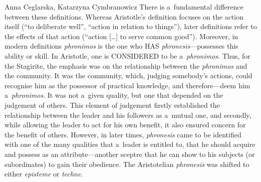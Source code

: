 \begin{artengenv2auth}{Anna Ceglarska, Katarzyna Cymbranowicz}
There is a~fundamental difference between these definitions. Whereas Aristotle's definition focuses on the action itself (``to deliberate well'', ``action in relation to things''), later definitions refer to the effects of that action (``action […] to serve common good''). Moreover, in modern definitions \textit{phronimos} is the one who HAS \textit{phronesis}---possesses this ability or skill. In Aristotle, one is CONSIDERED to be a~\textit{phronimos}. Thus, for the Stagirite, the emphasis was on the relationship between the \textit{phronimos} and the community. It was the community, which, judging somebody's actions, could recognise him as the possessor of practical knowledge, and therefore---deem him a~\textit{phronimos}. It was not a~given quality, but one that depended on the judgement of others. This element of judgement firstly established the relationship between the leader and his followers as a~mutual one, and secondly, while allowing the leader to act for his own benefit, it also ensured concern for the benefit of others. However, in later times, \textit{phronesis} came to be identified with one of the many qualities that a~leader is entitled to, that he should acquire and possess as an attribute---another sceptre that he can show to his subjects (or subordinates) to gain their obedience. The Aristotelian \textit{phronesis} was shifted to either \textit{episteme} or \textit{techne}.




\end{artengenv2auth}

